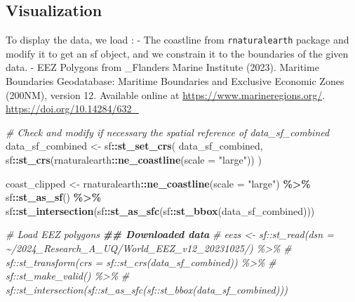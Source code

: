 \documentclass[
]{article}
\newenvironment{Shaded}{\begin{snugshade}}{\end{snugshade}}
\newcommand{\AttributeTok}[1]{\textcolor[rgb]{0.13,0.29,0.53}{#1}}
\newcommand{\CommentTok}[1]{\textcolor[rgb]{0.56,0.35,0.01}{\textit{#1}}}
\newcommand{\DocumentationTok}[1]{\textcolor[rgb]{0.56,0.35,0.01}{\textbf{\textit{#1}}}}
\newcommand{\FunctionTok}[1]{\textcolor[rgb]{0.13,0.29,0.53}{\textbf{#1}}}
\newcommand{\NormalTok}[1]{#1}
\newcommand{\OtherTok}[1]{\textcolor[rgb]{0.56,0.35,0.01}{#1}}
\newcommand{\SpecialCharTok}[1]{\textcolor[rgb]{0.81,0.36,0.00}{\textbf{#1}}}
\newcommand{\StringTok}[1]{\textcolor[rgb]{0.31,0.60,0.02}{#1}}
\begin{document}
\hypertarget{visualization}{%
\subsection{Visualization}\label{visualization}}

To display the data, we load : - The coastline from
\texttt{rnaturalearth} package and modify it to get an sf object, and we
constrain it to the boundaries of the given data. - EEZ Polygons from
\_Flanders Marine Institute (2023). Maritime Boundaries Geodatabase:
Maritime Boundaries and Exclusive Economic Zones (200NM), version 12.
Available online at \url{https://www.marineregions.org/}.
\url{https://doi.org/10.14284/632_}

\begin{Shaded}
\begin{Highlighting}[]
\CommentTok{\# Check and modify if necessary the spatial reference of data\_sf\_combined}
\NormalTok{data\_sf\_combined }\OtherTok{\textless{}{-}}\NormalTok{ sf}\SpecialCharTok{::}\FunctionTok{st\_set\_crs}\NormalTok{(}
\NormalTok{  data\_sf\_combined,}
\NormalTok{  sf}\SpecialCharTok{::}\FunctionTok{st\_crs}\NormalTok{(rnaturalearth}\SpecialCharTok{::}\FunctionTok{ne\_coastline}\NormalTok{(}\AttributeTok{scale =} \StringTok{"large"}\NormalTok{))}
\NormalTok{)}

\NormalTok{coast\_clipped }\OtherTok{\textless{}{-}}\NormalTok{ rnaturalearth}\SpecialCharTok{::}\FunctionTok{ne\_coastline}\NormalTok{(}\AttributeTok{scale =} \StringTok{"large"}\NormalTok{) }\SpecialCharTok{\%\textgreater{}\%}
\NormalTok{  sf}\SpecialCharTok{::}\FunctionTok{st\_as\_sf}\NormalTok{() }\SpecialCharTok{\%\textgreater{}\%}
\NormalTok{  sf}\SpecialCharTok{::}\FunctionTok{st\_intersection}\NormalTok{(sf}\SpecialCharTok{::}\FunctionTok{st\_as\_sfc}\NormalTok{(sf}\SpecialCharTok{::}\FunctionTok{st\_bbox}\NormalTok{(data\_sf\_combined)))}

\CommentTok{\# Load EEZ polygons}
\DocumentationTok{\#\# Downloaded data}
\CommentTok{\# eezs \textless{}{-} sf::st\_read(dsn = \textquotesingle{}\textasciitilde{}/2024\_Research\_A\_UQ/World\_EEZ\_v12\_20231025/\textquotesingle{}) \%\textgreater{}\%}
\CommentTok{\#   sf::st\_transform(crs = sf::st\_crs(data\_sf\_combined)) \%\textgreater{}\%}
\CommentTok{\#   sf::st\_make\_valid() \%\textgreater{}\%}
\CommentTok{\#   sf::st\_intersection(sf::st\_as\_sfc(sf::st\_bbox(data\_sf\_combined)))}


\end{Highlighting}
\end{Shaded}
\end{document}
